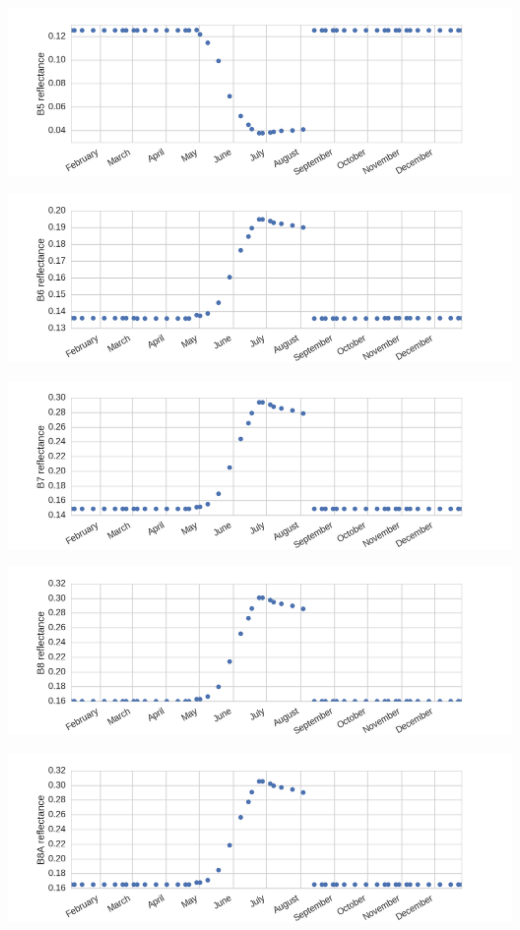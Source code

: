 \documentclass[letterpaper,10pt,english]{sphinxmanual}
\begin{document}
\includegraphics{B5.png}

\includegraphics{B6.png}

\includegraphics{B7.png}

\includegraphics{B8.png}

\includegraphics{B8A.png}
\end{document}
